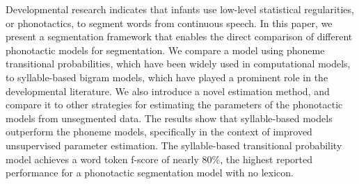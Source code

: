 Developmental research indicates that infants use low-level statistical regularities, or phonotactics, to segment words from continuous speech. In this paper, we present a segmentation framework that enables the direct comparison of different phonotactic models for segmentation. We compare a model using phoneme transitional probabilities, which have been widely used in computational models, to syllable-based bigram models, which have played a prominent role in the developmental literature. We also introduce a novel estimation method, and compare it to other strategies for estimating the parameters of the phonotactic models from unsegmented data. The results show that syllable-based models outperform the phoneme models, specifically in the context of improved unsupervised parameter estimation. The syllable-based transitional probability model achieves a word token f-score of nearly 80\%, the highest reported performance for a phonotactic segmentation model with no lexicon.
